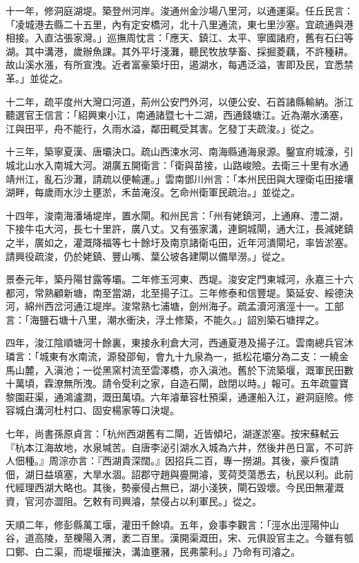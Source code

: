 十一年，修洞庭湖堤。築登州河岸。浚通州金沙場八里河，以通運渠。任丘民言：「凌城港去縣二十五里，內有定安橋河，北十八里通流，東七里沙塞。宜疏通與港相接。入直沽張家灣。」巡撫周忱言：「應天、鎮江、太平、寧國諸府，舊有石臼等湖。其中溝港，歲辦魚課。其外平圩淺灘，聽民牧放孳畜、採掘菱藕，不許種耕。故山溪水漲，有所宣洩。近者富豪築圩田，遏湖水，每遇泛溢，害即及民，宜悉禁革。」並從之。

十二年，疏平度州大灣口河道，荊州公安門外河，以便公安、石首諸縣輸納。浙江聽選官王信言：「紹興東小江，南通諸暨七十二湖，西通錢塘江。近為潮水湧塞，江與田平，舟不能行，久雨水溢，鄰田輒受其害。乞發丁夫疏浚。」從之。

十三年，築寧夏漢、唐壩決口。疏山西涑水河、南海縣通海泉源。鑿宣府城濠，引城北山水入南城大河。湖廣五開衛言：「衛與苗接，山路峻險。去衛三十里有水通靖州江，亂石沙灘，請疏以便輸運。」雲南鄧川州言：「本州民田與大理衛屯田接壤湖畔，每歲雨水沙土壅淤，禾苗淹沒。乞命州衛軍民疏治。」並從之。

十四年，浚南海潘埇堤岸，置水閘。和州民言：「州有姥鎮河，上通麻、澧二湖，下接牛屯大河，長七十里許，廣八丈。又有張家溝，連銅城閘，通大江，長減姥鎮之半，廣如之，灌溉降福等七十餘圩及南京諸衛屯田，近年河潰閘圮，率皆淤塞。請興役疏浚，仍於姥鎮、豐山嘴、葉公坡各建閘以備旱澇。」從之。

景泰元年，築丹陽甘露等壩。二年修玉河東、西堤。浚安定門東城河，永嘉三十六都河，常熟顧新塘，南至當湖，北至揚子江。三年修泰和信豐堤。築延安、綏德決河，綿州西岔河通江堤岸。浚常熟七浦塘，劍州海子。疏孟瀆河濱涇十一。工部言：「海鹽石塘十八里，潮水衝決，浮土修築，不能久。」詔別築石塘捍之。

四年，浚江陰順塘河十餘裏，東接永利倉大河，西通夏港及揚子江。雲南總兵官沐璘言：「城東有水南流，源發邵甸，會九十九泉為一，抵松花壩分為二支：一繞金馬山麓，入滇池；一從黑窯村流至雲澤橋，亦入滇池。舊於下流築堰，溉軍民田數十萬頃，霖潦無所洩。請令受利之家，自造石閘，啟閉以時。」報可。五年疏靈寶黎園莊渠，通鴻瀘澗，溉田萬頃。六年濬華容杜預渠，通運船入江，避洞庭險。修容城白溝河杜村口、固安楊家等口決堤。

七年，尚書孫原貞言：「杭州西湖舊有二閘，近皆傾圮，湖遂淤塞。按宋蘇軾云『杭本江海故地，水泉堿苦。自唐李泌引湖水入城為六井，然後井邑日富，不可許人佃種。』周淙亦言：『西湖貴深闊。』因招兵二百，專一撈湖。其後，豪戶復請佃，湖日益填塞，大旱水涸。詔郡守趙與亹開濬，芰荷茭蕩悉去，杭民以利。此前代經理西湖大略也。其後，勢豪侵占無已，湖小淺狹，閘石毀壞。今民田無灌溉資，官河亦澀阻。乞敕有司興濬，禁侵占以利軍民。」從之。

天順二年，修彭縣萬工堰，灌田千餘頃。五年，僉事李觀言：「涇水出涇陽仲山谷，道高陵，至櫟陽入渭，袤二百里。漢開渠溉田，宋、元俱設官主之。今雖有瓠口鄭、白二渠，而堤堰摧決，溝洫壅瀦，民弗蒙利。」乃命有司濬之。

